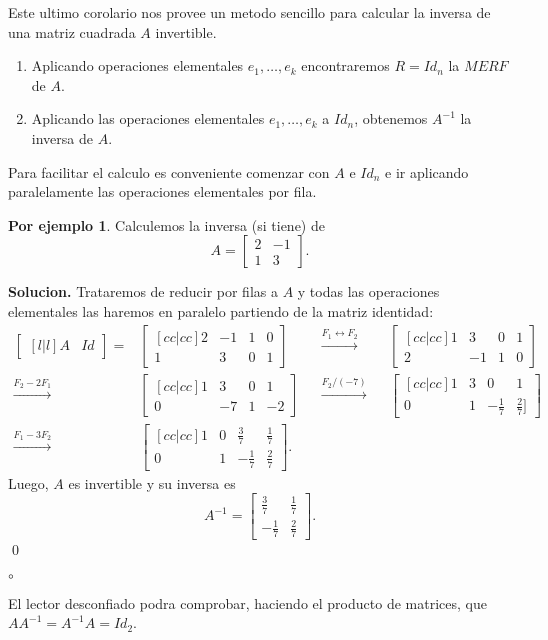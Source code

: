 \documentclass{article}
\theoremstyle{definition}
\theoremstyle{definition}
\newtheorem*{ej}{Por ejemplo}
\theoremstyle{remark}
\begin{document}
Este ultimo corolario nos provee un metodo sencillo para calcular la inversa de una matriz cuadrada $A$ invertible. \begin{enumerate}[label=\textcolor{azulp2}{\arabic*}]
    \item Aplicando operaciones elementales $e_1,\dots,e_k$ encontraremos $R = Id_n$ la $MERF$ de $A$. 
    \item Aplicando las operaciones elementales $e_1, \dots ,e_k$ a $Id_n$, obtenemos $A^{-1}$ la inversa de $A$.
 \end{enumerate}
 Para facilitar el calculo es conveniente comenzar con $A$ e $Id_n$ e ir aplicando paralelamente las operaciones elementales por fila.
 \begin{ej}
   Calculemos la inversa (si tiene) de \[
     A=\begin{bmatrix} 2 & -1 \\ 1 & 3 \end{bmatrix}.
   \]
 \end{ej}
 \textbf{Solucion.} Trataremos de reducir por filas a $A$ y todas las operaciones elementales las haremos en paralelo partiendo de la matriz identidad: \[\begin{aligned}
   \begin{bmatrix}[l|l]A & Id \end{bmatrix}= &\begin{bmatrix}[cc|cc] 2 & -1 & 1 & 0 \\ 1 & 3 & 0 & 1 \end{bmatrix} &&\xrightarrow{F_1 \leftrightarrow F_2} &&\begin{bmatrix}[cc|cc] 1 & 3 & 0 & 1 \\ 2 & -1 & 1 & 0 \end{bmatrix} \\
   \xrightarrow{F_2-2F_1} &\begin{bmatrix}[cc|cc]1 & 3 & 0 & 1 \\ 0 & -7 & 1 & -2 \end{bmatrix} &&\xrightarrow{F_2/(-7)} &&\begin{bmatrix}[cc|cc] 1 & 3 & 0 & 1 \\ 0 & 1 & -\tfrac{1}{7} & \tfrac{2}{7}] \end{bmatrix} \\
   \xrightarrow{F_1-3F_2} &\begin{bmatrix}[cc|cc]1 & 0 & \tfrac{3}{7} & \tfrac{1}{7} \\ 0 & 1 & -\tfrac{1}{7} & \tfrac{2}{7} \end{bmatrix}.
 \end{aligned}
 \]
 Luego, $A$ es invertible y su inversa es \[
   A^{-1}=\begin{bmatrix}\tfrac{3}{7} & \tfrac{1}{7} \\ -\tfrac{1}{7} & \tfrac{2}{7} \end{bmatrix}.
 \]
 \qed
\begin{list}{$\circ$}{}  
\item  El lector desconfiado podra comprobar, haciendo el producto de matrices, que $AA^{-1}=A^{-1}A=Id_2$.
\end{list}
\pagebreak
\end{document}
